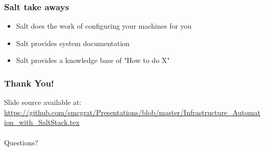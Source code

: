 \documentclass{beamer}
\begin{document}
\begin{frame}
\frametitle{Salt take aways}
\begin{itemize}
\item Salt does the work of configuring your machines for you
\item Salt provides system documentation
\item Salt provides a knowledge base of "How to do X"
\end{itemize}
\end{frame}

\begin{frame}[fragile]
\frametitle{Thank You!}
Slide source available at: \url{https://github.com/smcgrat/Presentations/blob/master/Infrastructure_Automation_with_SaltStack.tex} \\~\\
Questions?
\end{frame}
\end{document}
